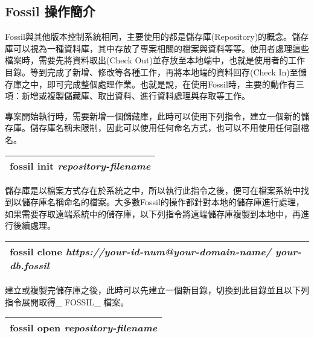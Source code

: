 \subsection{Fossil 操作簡介}
\par
\renewcommand{\baselinestretch}{1} %
\twelve Fossil與其他版本控制系統相同，主要使用的都是儲存庫(Repository)的概念。儲存庫可以視為一種資料庫，其中存放了專案相關的檔案與資料等等。使用者處理這些檔案時，需要先將資料取出(Check Out)並存放至本地端中，也就是使用者的工作目錄。等到完成了新增、修改等各種工作，再將本地端的資料回存(Check In)至儲存庫之中，即可完成整個處理作業。也就是說，在使用Fossil時，主要的動作有三項：新增或複製儲藏庫、取出資料、進行資料處理與存取等工作。
\\
\par
\renewcommand{\baselinestretch}{1} %
\twelve 專案開始執行時，需要新增一個儲藏庫，此時可以使用下列指令，建立一個新的儲存庫。儲存庫名稱未限制，因此可以使用任何命名方式，也可以不用使用任何副檔名。
\par
\begin{center}
\begin{tabular}{||p{15cm}|} %
\hline
\textbf{fossil init} \emph{repository-filename}
\\
\hline
\end{tabular}
\end{center}
\par
\renewcommand{\baselinestretch}{1} %
\twelve 儲存庫是以檔案方式存在於系統之中，所以執行此指令之後，便可在檔案系統中找到以儲存庫名稱命名的檔案。大多數Fossil的操作都針對本地的儲存庫進行處理，如果需要存取遠端系統中的儲存庫，以下列指令將遠端儲存庫複製到本地中，再進行後續處理。
\par
\begin{center}
\begin{tabular}{||p{15cm}|} %
\hline
\textbf{fossil clone} \emph{https://your-id-num@your-domain-name/ your-db.fossil}
\\
\hline
\end{tabular}
\end{center}
\par
\renewcommand{\baselinestretch}{1} %
\twelve 建立或複製完儲存庫之後，此時可以先建立一個新目錄，切換到此目錄並且以下列指令展開取得\_ FOSSIL\_ 檔案。
\par
\begin{center}
\begin{tabular}{||p{15cm}|} %
\hline
\textbf{fossil open} \emph{repository-filename}
\\
\hline
\end{tabular}
\end{center}
